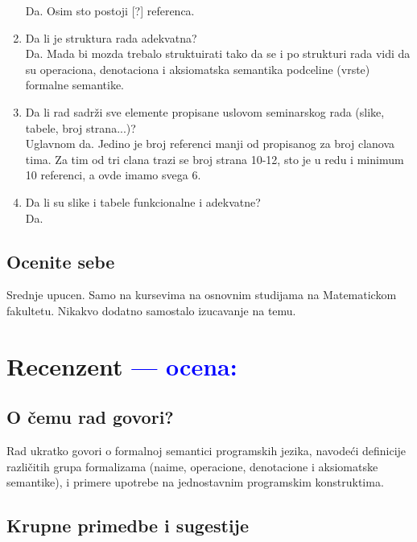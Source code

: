 \documentclass[a4paper]{report}
\newcommand{\odgovor}[1]{\textcolor{blue}{#1}}
\begin{document}
\begin{enumerate}
Da. Osim sto postoji [?] referenca. 
\item Da li je struktura rada adekvatna?\\
Da. Mada bi mozda trebalo struktuirati tako da se i po strukturi rada vidi da su operaciona, denotaciona i aksiomatska semantika podceline (vrste) formalne semantike.
\item Da li rad sadrži sve elemente propisane uslovom seminarskog rada (slike, tabele, broj strana...)?\\
Uglavnom da. Jedino je broj referenci manji od propisanog za broj clanova tima. Za tim od tri clana trazi se broj strana 10-12, sto je u redu i minimum 10 referenci, a ovde imamo svega 6.
\item Da li su slike i tabele funkcionalne i adekvatne?\\
Da.
\end{enumerate}

\section{Ocenite sebe}
Srednje upucen. Samo na kursevima na osnovnim studijama na Matematickom fakultetu. Nikakvo dodatno samostalo izucavanje na temu.


\chapter{Recenzent \odgovor{--- ocena:} }


\section{O čemu rad govori?}

Rad ukratko govori o formalnoj semantici programskih jezika, navodeći definicije različitih grupa formalizama (naime, operacione, denotacione i aksiomatske semantike), i 
primere upotrebe na jednostavnim programskim konstruktima.

\section{Krupne primedbe i sugestije}
\end{document}
